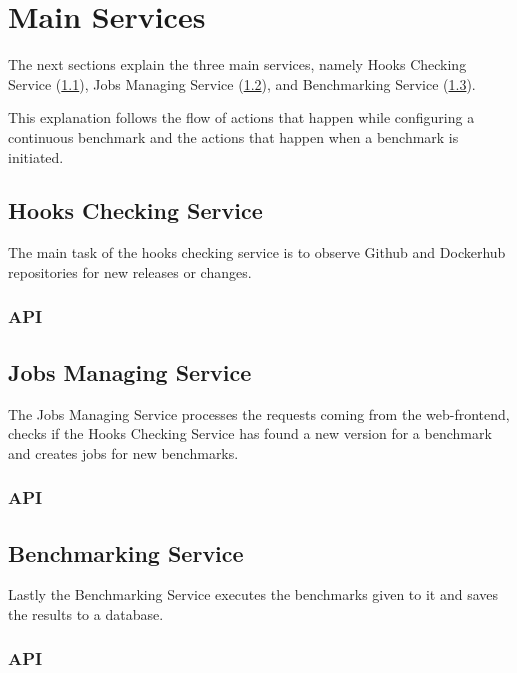 \section{Main Services}
\label{sec:main_services}
The next sections explain the three main services, namely Hooks Checking Service (\ref{sec:hooks_checking_service}), Jobs Managing Service (\ref{sec:jobs_managing_service}), and \ts{} Benchmarking Service (\ref{sec:ts_benchmarking_service}).

This explanation follows the flow of actions that happen while configuring a continuous benchmark and the actions that happen when a benchmark is initiated.




\subsection{Hooks Checking Service}
\label{sec:hooks_checking_service}
The main task of the hooks checking service is to observe Github and Dockerhub repositories for new releases or changes.

\subsubsection{API}
\label{sec:hooks_api}


\subsection{Jobs Managing Service}
\label{sec:jobs_managing_service}
The Jobs Managing Service processes the requests coming from the web-frontend, checks if the Hooks Checking Service has found a new version for a benchmark and creates jobs for new benchmarks.

\subsubsection{API}
\label{sec:jobs_api}


\subsection{\ts{} Benchmarking Service}
\label{sec:ts_benchmarking_service}
Lastly the \ts{} Benchmarking Service executes the benchmarks given to it and saves the results to a database.

\subsubsection{API}
\label{sec:benchmarking_api}


